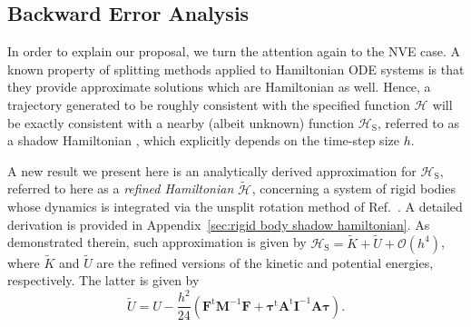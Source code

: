 \documentclass[
journal=jctcce,
layout=twocolumn
]{achemso}
\newcommand{\mt}[1]{\boldsymbol{\mathbf{#1}}}   %
\newcommand{\vt}[1]{\boldsymbol{\mathbf{#1}}}   %
\newcommand{\tr}[1]{#1^\text{t}}                %
\newcommand{\Ham}[1]{{\mathcal H}_\text{#1}}    %
\newcommand{\timestep}{h}
\newcommand{\refined}[1]{\widetilde{#1}}
\begin{document}
\subsection{Backward Error Analysis}
\label{sec:modified_h}

In order to explain our proposal, we turn the attention again to the NVE case.
A known property of splitting methods applied to Hamiltonian ODE systems is that they provide approximate solutions which are Hamiltonian as well.
Hence, a trajectory generated to be roughly consistent with the specified function $\Ham{}$ will be exactly consistent with a nearby (albeit unknown) function $\Ham{S}$, referred to as a shadow Hamiltonian \cite{Hairer_2006}, which explicitly depends on the time-step size $\timestep$.

A new result we present here is an analytically derived approximation for $\Ham{S}$, referred to here as a \textit{refined Hamiltonian} $\refined{\Ham{}}$, concerning a system of rigid bodies whose dynamics is integrated via the unsplit rotation method of Ref.~.
A detailed derivation is provided in Appendix~\ref{sec:rigid body shadow hamiltonian}.
As demonstrated therein, such approximation is given by $\Ham{S} = \refined K + \refined U + \mathcal{O}(\timestep^4)$, where $\refined K$ and $\refined U$ are the refined versions of the kinetic and potential energies, respectively.
The latter is given by
\begin{equation}
\label{eq:modified potential energy}
\refined U = U - \frac{\timestep^2}{24} \left( \tr{\vt F} {\mt M}^{-1} {\vt F} + \tr{\vt \tau} \tr{\mt A} {\mt I}^{-1} {\mt A} {\vt \tau} \right).
\end{equation}
\end{document}
